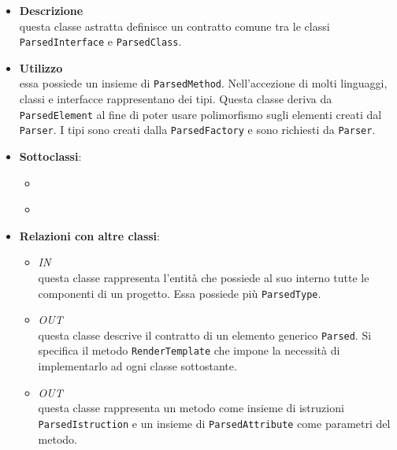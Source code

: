 \label{\nogloxy{swedesigner::server::project::ParsedType}}
\begin{itemize}
\item \textbf{Descrizione}\\
questa classe astratta definisce un contratto comune tra le classi \texttt{ParsedInterface} e \texttt{ParsedClass}. 
\item \textbf{Utilizzo}\\
essa possiede un insieme di \texttt{ParsedMethod}. Nell'accezione di molti linguaggi, classi e interfacce rappresentano dei tipi. Questa classe deriva da \texttt{ParsedElement} al fine di poter usare polimorfismo sugli elementi creati dal \texttt{Parser}. 
I tipi sono creati dalla \texttt{ParsedFactory} e sono richiesti da \texttt{Parser}.
\item \textbf{Sottoclassi}:
\begin{itemize}
\item \hyperref[\nogloxy{swedesigner::server::project::ParsedClass}]{}
\item \hyperref[\nogloxy{swedesigner::server::project::ParsedInterface}]{}
\end{itemize}
\item \textbf{Relazioni con altre classi}:
\begin{itemize}
\item \textit{IN} \hyperref[\nogloxy{swedesigner::server::project::ParsedProgram}]{}\\
questa classe rappresenta l'entità che possiede al suo interno tutte le componenti di un progetto. Essa possiede più \texttt{ParsedType}.
\item \textit{OUT} \hyperref[\nogloxy{swedesigner::server::project::ParsedElement}]{}\\
questa classe descrive il contratto di un elemento generico \texttt{Parsed}. Si specifica il metodo \texttt{RenderTemplate} che impone la necessità di implementarlo ad ogni classe sottostante.
\item \textit{OUT} \hyperref[\nogloxy{swedesigner::server::project::ParsedMethod}]{}\\
questa classe rappresenta un metodo come insieme di istruzioni \texttt{ParsedIstruction} e un insieme di \texttt{ParsedAttribute} come parametri del metodo.
\end{itemize}
\end{itemize}


